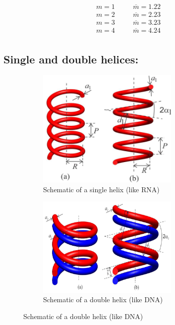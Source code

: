 \begin{equation*}
    \begin{aligned}
        m = 1 &\quad& \overline{m}=1.22\\
        m = 2 &\quad& \overline{m}=2.23\\
        m = 3 &\quad& \overline{m}=3.23\\
        m = 4 &\quad& \overline{m}=4.24\\
    \end{aligned}
\end{equation*}

\subsection*{Single and double helices:}
  
\begin{figure}[!htb]
    \centering
    \begin{subfigure}[b]{0.45\textwidth}
                \centering
                \includegraphics[width=0.75\textwidth]{figs/singlehelix.png}
                \caption{Schematic of a single helix (like RNA)}
                \label{fig:singlehelix1}
        \end{subfigure}%
        \begin{subfigure}[b]{0.45\textwidth}
                \centering
                \includegraphics[width=0.75\textwidth]{figs/doublehelix.png}
                \caption{Schematic of a double helix (like DNA)}
                \label{fig:doublehelix1}
        \end{subfigure}
\end{figure}

